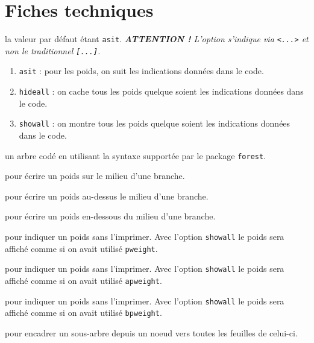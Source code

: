 \documentclass[12pt,a4paper]{article}
\begin{document}

\section{Fiches techniques}


\IDoption{} la valeur par défaut étant \verb#asit#.
            \emph{\textbf{ATTENTION !} L'option s'indique via \texttt{<...>} et non le traditionnel \texttt{[...]}.}

\begin{enumerate}
    \item \verb#asit# : pour les poids, on suit les indications données dans le code.

    \item \verb#hideall# : on cache tous les poids quelque soient les indications données dans le code.

    \item \verb#showall# : on montre tous les poids quelque soient les indications données dans le code.
\end{enumerate}

\Content{} un arbre codé en utilisant la syntaxe supportée par le package \verb#forest#.

\extraspace

  pour écrire un poids sur le milieu d'une branche.

 pour écrire un poids au-dessus le milieu d'une branche.

 pour écrire un poids en-dessous du milieu d'une branche.

\extraspace

 pour indiquer un poids sans l'imprimer.
Avec l'option \verb#showall# le poids sera affiché comme si on avait utilisé \verb#pweight#.

 pour indiquer un poids sans l'imprimer.
Avec l'option \verb#showall# le poids sera affiché comme si on avait utilisé \verb#apweight#.

 pour indiquer un poids sans l'imprimer.
Avec l'option \verb#showall# le poids sera affiché comme si on avait utilisé \verb#bpweight#.

\extraspace

 pour encadrer un sous-arbre depuis un noeud vers toutes les feuilles de celui-ci.
\end{document}
